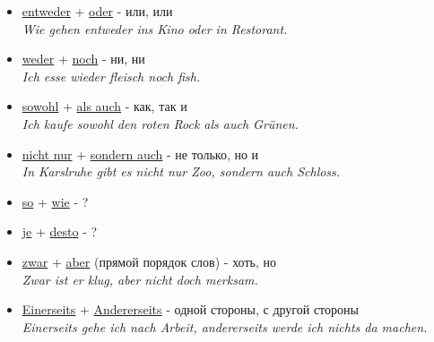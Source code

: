 \documentclass[12pt,a4paper]{report}
\newcommand{\satzew}[1]{\underline{#1}}
\newcommand{\ubersatze}[1]{\textit{#1}}
\begin{document}
\begin{itemize}
\item \satzew{entweder} + \satzew{oder} - или, или
~\\ \ubersatze{Wie gehen entweder ins Kino oder in Restorant.}
\item \satzew{weder} + \satzew{noch} - ни, ни
~\\ \ubersatze{Ich esse wieder fleisch noch fish.}
\item \satzew{sowohl} + \satzew{als auch} - как, так и
~\\ \ubersatze{Ich kaufe sowohl den roten Rock als auch Grünen.}
\item \satzew{nicht nur} + \satzew{sondern auch} - не только, но и
~\\ \ubersatze{In Karslruhe gibt es nicht nur Zoo, sondern auch Schloss.}
\item \satzew{so} + \satzew{wie} - ?
\item \satzew{je} + \satzew{desto} - ?
\item \satzew{zwar} + \satzew{aber} (прямой порядок слов) - хоть, но
~\\ \ubersatze{Zwar ist er klug, aber nicht doch merksam.}
\item \satzew{Einerseits} + \satzew{Andererseits} -  одной стороны, с другой стороны
~\\ \ubersatze{Einerseits gehe ich nach Arbeit, andererseits werde ich nichts da machen.}
\end{itemize}

\end{document}
